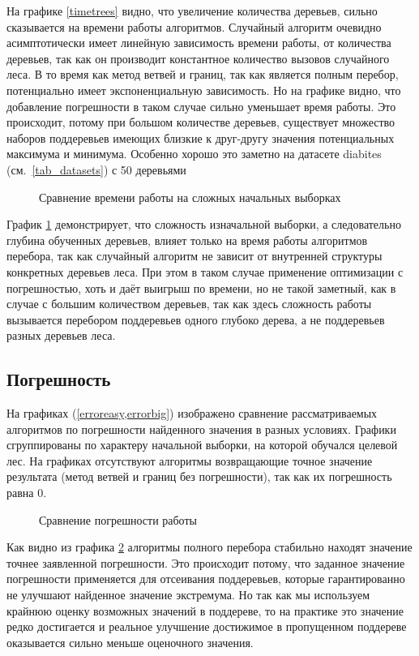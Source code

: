 На графике \cref{timetrees} видно, что увеличение количества деревьев, сильно
сказывается на времени работы алгоритмов. Случайный алгоритм очевидно
асимптотически имеет линейную зависимость времени работы, от количества
деревьев, так как он производит константное количество вызовов случайного леса.
В то время как метод ветвей и границ, так как является полным перебор,
потенциально имеет экспоненциальную зависимость. Но на графике видно, что
добавление погрешности в таком случае сильно уменьшает время работы. Это
происходит, потому при большом количестве деревьев, существует множество наборов
поддеревьев имеющих близкие к друг-другу значения потенциальных максимума
и минимума. Особенно хорошо это заметно на датасете diabites
(см.~\cref{tab_datasets}) с 50 деревьями

\begin{figure}[!ht]
    \caption{Сравнение времени работы на сложных начальных выборках}\label{timebig}
\end{figure}

График \cref{timebig} демонстрирует, что сложность изначальной выборки,
а следовательно глубина обученных деревьев, влияет только на время работы
алгоритмов перебора, так как случайный алгоритм не зависит от внутренней
структуры конкретных деревьев леса. При этом в таком случае применение
оптимизации с погрешностью, хоть и даёт выигрыш по времени, но не такой
заметный, как в случае с большим количеством деревьев, так как здесь сложность
работы вызывается перебором поддеревьев одного глубоко дерева, а не поддеревьев
разных деревьев леса.

\subsection{Погрешность}

На графиках (\cref{erroreasy,errorbig}) изображено сравнение рассматриваемых
алгоритмов по погрешности найденного значения в разных условиях. Графики
сгруппированы по характеру начальной выборки, на которой обучался целевой лес.
На графиках отсутствуют алгоритмы возвращающие точное значение результата (метод
ветвей и границ без погрешности), так как их погрешность равна $0$.

\begin{figure}[!ht]
    \caption{Сравнение погрешности работы}\label{erroreasy}
\end{figure}

Как видно из графика \cref{erroreasy} алгоритмы полного перебора стабильно
находят значение точнее заявленной погрешности. Это происходит потому, что
заданное значение погрешности применяется для отсеивания поддеревьев, которые
гарантированно не улучшают найденное значение экстремума. Но так как мы
используем крайнюю оценку возможных значений в поддереве, то на практике это
значение редко достигается и реальное улучшение достижимое в пропущенном
поддереве оказывается сильно меньше оценочного значения.


